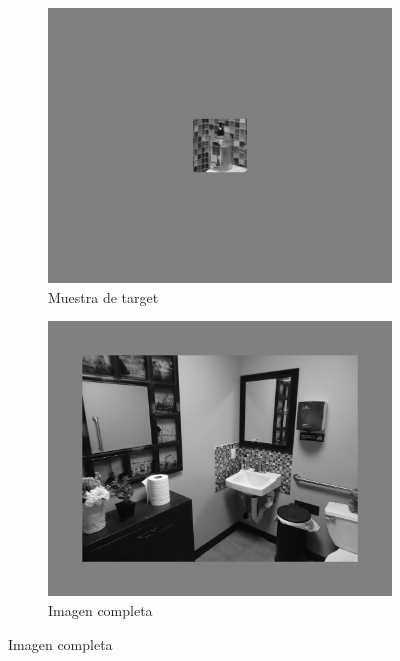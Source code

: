 \documentclass[compress]{beamer}
\begin{document}
\begin{frame}
\begin{figure}[!b]
    \centering
    \begin{subfigure}[b]{0.32\textwidth}
        \centering
        \includegraphics[width=\linewidth]{images/target_bathroom.jpg} 
        \caption{Muestra de target} \label{fig:expe-etapa-1}
    \end{subfigure}
    \hfill
    \begin{subfigure}[b]{0.32\textwidth}
        \centering
        \includegraphics[width=\linewidth]{images/full_bathroom.jpg} 
        \caption{Imagen completa} \label{fig:expe-etapa-3}

\end{subfigure}
\end{figure}
\end{frame}
\end{document}
